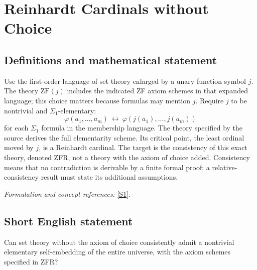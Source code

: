 \documentclass[11pt]{article}
\newcommand{\sref}[2]{\hyperlink{source:#1:#2}{[S#2]}}
\newif\ifshowcatalogue
\newcommand{\cataloguescope}[1]{\ifshowcatalogue
 \paragraph{Exact scope in the supplied catalogue.}
 \begin{quote}\small #1\end{quote}\fi}
\begin{document}
\setcounter{section}{0}
\clearpage
\section*{\texorpdfstring{Reinhardt Cardinals without Choice}{Reinhardt Cardinals without Choice}}\label{1357}
\subsection{Definitions and mathematical statement}
Use the first-order language of set theory enlarged by a unary function symbol $j$. The theory $\mathrm{ZF}(j)$ includes the indicated ZF axiom schemes in that expanded language; this choice matters because formulas may mention $j$. Require $j$ to be nontrivial and $\Sigma_1$-elementary:
\[
 \varphi(a_1,\ldots,a_m)\ \longleftrightarrow\
 \varphi(j(a_1),\ldots,j(a_m))
\]
for each $\Sigma_1$ formula in the membership language. The theory specified by the source derives the full elementarity scheme. Its critical point, the least ordinal moved by $j$, is a Reinhardt cardinal. The target is the consistency of this exact theory, denoted ZFR, not a theory with the axiom of choice added. Consistency means that no contradiction is derivable by a finite formal proof; a relative-consistency result must state its additional assumptions.
\par\smallskip\textit{Formulation and concept references:} \sref{1357}{1}.
\cataloguescope{Determine whether ZFR is consistent, where ZFR is the first-order theory ZF(j) plus the assertion that a nontrivial function symbol j:V->V is Sigma\_1-elementary and hence fully elementary as a theorem scheme.}
\subsection{Short English statement}
Can set theory without the axiom of choice consistently admit a nontrivial elementary self-embedding of the entire universe, with the axiom schemes specified in ZFR?
\end{document}
